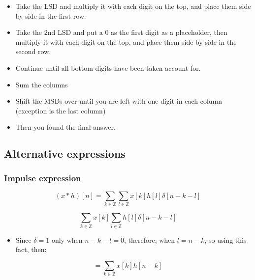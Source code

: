 \begin{example}
    \begin{itemize}
        \item Take the LSD and multiply it with each digit on the top, and place them side by side in the first row. 
        \item Take the 2nd LSD and put a 0 as the first digit as a placeholder, then multiply it with each digit on the top, and place them side by side in the second row. 
        \item Continue until all bottom digits have been taken account for. 
        \item Sum the columns 
        \item Shift the MSDs over until you are left with one digit in each column (exception is the last column)
        \item Then you found the final answer. 
    \end{itemize}
\end{example}

\subsection{Alternative expressions}

\subsubsection{Impulse expression}
\begin{definition}
    \begin{equation}
        (x \ast h)[n] = \sum_{k \in \mathbb{Z}} \sum_{l \in \mathbb{Z}} x[k] h[l] \delta[n - k - l]
    \end{equation}
\end{definition}

\begin{derivation}
    \[
    \sum_{k \in \mathbb{Z}} x[k] \sum_{l \in \mathbb{Z}} h[l] \delta[n - k - l]
    \]
    \begin{itemize}
        \item Since $\delta=1$ only when $n-k-l=0$, therefore, when $l=n-k$, so using this fact, then:
    \end{itemize}
    \[
    = \sum_{k \in \mathbb{Z}} x[k] h[n-k]
    \]
\end{derivation}

